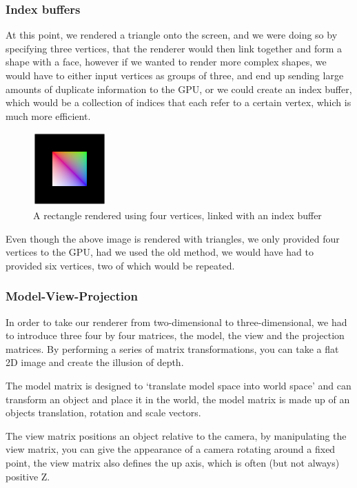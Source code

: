 \documentclass[../report.tex]{subfiles}
\begin{document}
\subsubsection{Index buffers}

At this point, we rendered a triangle onto the screen, and we were doing so by specifying three vertices, that the renderer would then link together and form a shape with a face, however if we wanted to render more complex shapes, we would have to either input vertices as groups of three, and end up sending large amounts of duplicate information to the GPU, or we could create an index buffer, which would be a collection of indices that each refer to a certain vertex, which is much more efficient.

\begin{figure}[h]
    \centering
    \includegraphics[width=0.25\textwidth]{images/index_buffers.png}
    \caption{A rectangle rendered using four vertices, linked with an index buffer}
\end{figure}

Even though the above image is rendered with triangles, we only provided four vertices to the GPU, had we used the old method, we would have had to provided six vertices, two of which would be repeated.

\subsubsection{Model-View-Projection}
In order to take our renderer from two-dimensional to three-dimensional, we had to introduce three four by four matrices, the model, the view and the projection matrices.
By performing a series of matrix transformations, you can take a flat 2D image and create the illusion of depth.

The model matrix is designed to `translate model space into world space'  and can transform an object and place it in the world, the model matrix is made up of an objects translation, rotation and scale vectors.

The view matrix positions an object relative to the camera, by manipulating the view matrix, you can give the appearance of a camera rotating around a fixed point, the view matrix also defines the up axis, which is often (but not always) positive Z.
\end{document}
